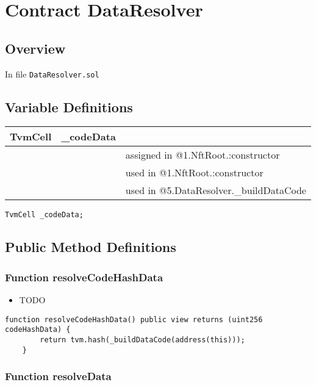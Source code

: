 
\chapter{Contract DataResolver}

\minitoc

\section{Overview}


In file {\tt DataResolver.sol}

\section{Variable Definitions}


\ifsoltables
\noindent\begin{tabular}{|l|l|p{5cm}|}\hline
TvmCell & \_{}codeData &  \\\hline
 & & assigned in @1.NftRoot.:constructor\\\hline
 & & used in @1.NftRoot.:constructor\\\hline
 & & used in @5.DataResolver.\_{}buildDataCode\\\hline
\end{tabular}
\fi


\begin{lstlisting}[firstnumber=11]
    TvmCell _codeData;
\end{lstlisting}

\section{Public Method Definitions}


\subsection{Function resolveCodeHashData}

\begin{itemize}
\item TODO
\end{itemize}

\begin{lstlisting}[firstnumber=13]
    function resolveCodeHashData() public view returns (uint256 codeHashData) {
        return tvm.hash(_buildDataCode(address(this)));
    }
\end{lstlisting}

\subsection{Function resolveData}

